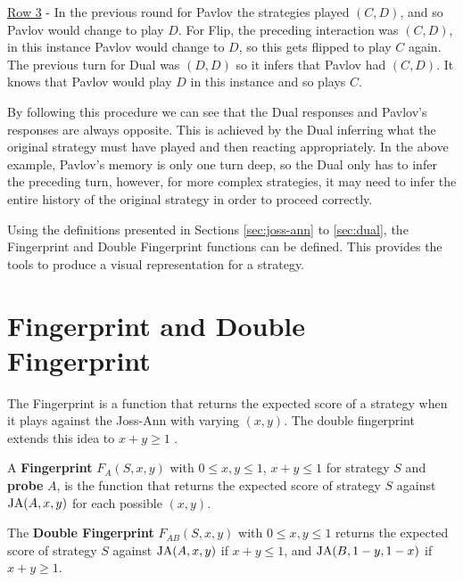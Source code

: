 \underline{Row 3} - In the previous round for Pavlov the strategies played $(C, D)$, and so Pavlov would change to play $D$.
For Flip, the preceding interaction was $(C, D)$, in this instance Pavlov would change to $D$, so this gets flipped to play $C$ again.
The previous turn for Dual was $(D, D)$ so it infers that Pavlov had $(C, D)$.
It knows that Pavlov would play $D$ in this instance and so plays $C$.

By following this procedure we can see that the Dual responses and Pavlov's responses are always opposite.
This is achieved by the Dual inferring what the original strategy must have played and then reacting appropriately.
In the above example, Pavlov's memory is only one turn deep, so the Dual only has to infer the preceding turn, however, for more complex strategies, it may need to infer the entire history of the original strategy in order to proceed correctly.

Using the definitions presented in Sections \ref{sec:joss-ann} to \ref{sec:dual}, the Fingerprint and Double Fingerprint functions can be defined.
This provides the tools to produce a visual representation for a strategy.


\section{Fingerprint and Double Fingerprint}
The Fingerprint is a function that returns the expected score of a strategy when it plays against the Joss-Ann with varying $(x, y)$.
The double fingerprint extends this idea to $x+y \geq 1$ \cite{Ashlock2008, Ashlock2010, Ashlock2004,  Ashlock2005, Ashlock2009, Ashlock2006}.

\begin{definition}\label{def:fingerprint}
A \textbf{Fingerprint} $F_A(S, x, y)$ with $0 \leq x, y \leq 1$, $x+y \leq 1$ for strategy $S$ and \textbf{probe} $A$, is the function that returns the expected score of strategy $S$ against $\text{JA}(A, x, y)$ for each possible $(x, y)$.
\end{definition}


\begin{definition}\label{def:double-fingerprint}
The \textbf{Double Fingerprint} $F_{AB}(S, x, y)$ with $0 \leq x, y \leq 1$ returns the expected score of strategy $S$ against $\text{JA}(A, x, y)$ if $x+y \leq 1$, and $\text{JA}(B, 1-y, 1-x)$ if $x+y \geq 1$.
\end{definition}

